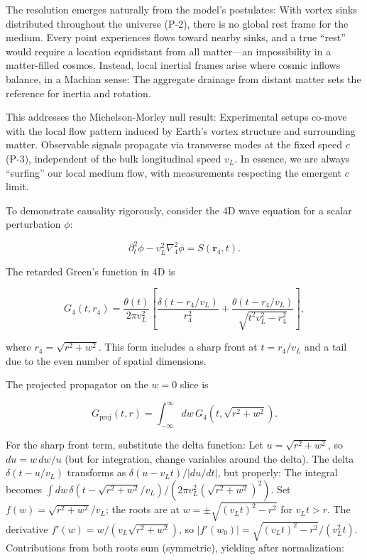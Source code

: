 The resolution emerges naturally from the model's postulates: With vortex sinks distributed throughout the universe (P-2), there is no global rest frame for the medium. Every point experiences flows toward nearby sinks, and a true ``rest'' would require a location equidistant from all matter---an impossibility in a matter-filled cosmos. Instead, local inertial frames arise where cosmic inflows balance, in a Machian sense: The aggregate drainage from distant matter sets the reference for inertia and rotation.

This addresses the Michelson-Morley null result: Experimental setups co-move with the local flow pattern induced by Earth's vortex structure and surrounding matter. Observable signals propagate via transverse modes at the fixed speed $c$ (P-3), independent of the bulk longitudinal speed $v_L$. In essence, we are always ``surfing'' our local medium flow, with measurements respecting the emergent $c$ limit.

To demonstrate causality rigorously, consider the 4D wave equation for a scalar perturbation $\phi$:

\begin{equation}
\partial_t^2 \phi - v_L^2 \nabla_4^2 \phi = S(\mathbf{r}_4, t).
\end{equation}

The retarded Green's function in 4D is

\begin{equation}
G_4(t, r_4) = \frac{\theta(t)}{2\pi v_L^2} \left[ \frac{\delta(t - r_4 / v_L)}{r_4^2} + \frac{\theta(t - r_4 / v_L)}{\sqrt{t^2 v_L^2 - r_4^2}} \right],
\end{equation}

where $r_4 = \sqrt{r^2 + w^2}$. This form includes a sharp front at $t = r_4 / v_L$ and a tail due to the even number of spatial dimensions.

The projected propagator on the $w=0$ slice is

\begin{equation}
G_{\text{proj}}(t, r) = \int_{-\infty}^{\infty} dw \, G_4(t, \sqrt{r^2 + w^2}).
\end{equation}

For the sharp front term, substitute the delta function: Let $u = \sqrt{r^2 + w^2}$, so $du = w \, dw / u$ (but for integration, change variables around the delta). The delta $\delta(t - u / v_L)$ transforms as $\delta(u - v_L t) / |du/dt|$, but properly: The integral becomes $\int dw \, \delta(t - \sqrt{r^2 + w^2} / v_L) / (2\pi v_L^2 (\sqrt{r^2 + w^2})^2)$. Set $f(w) = \sqrt{r^2 + w^2} / v_L$; the roots are at $w = \pm \sqrt{(v_L t)^2 - r^2}$ for $v_L t > r$. The derivative $f'(w) = w / (v_L \sqrt{r^2 + w^2})$, so $|f'(w_0)| = \sqrt{(v_L t)^2 - r^2} / (v_L^2 t)$. Contributions from both roots sum (symmetric), yielding after normalization:

